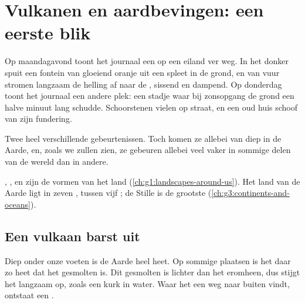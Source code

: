 \chapter{Vulkanen en aardbevingen: een eerste blik}\label{ch:g4:volcanoes-earthquakes-first-look}

Op maandagavond toont het journaal een  op een eiland ver weg. In
het donker spuit een fontein van gloeiend oranje  uit een spleet
in de grond, en  van vuur stromen langzaam de helling af naar de
, sissend en dampend. Op donderdag toont het journaal een andere plek:
een stadje waar bij zonsopgang de grond een halve minuut lang schudde.
Schoorstenen vielen op straat, en een oud huis schoof van zijn fundering.

Twee heel verschillende gebeurtenissen. Toch komen ze allebei van diep in
de Aarde, en, zoals we zullen zien, ze gebeuren allebei veel vaker in
sommige delen van de wereld dan in andere.

\begin{recall}
, ,  en  zijn de vormen van het land
(\cref{ch:g1:landscapes-around-us}). Het land van de Aarde ligt in zeven
, tussen vijf ; de Stille  is de grootste 
(\cref{ch:g3:continents-and-oceans}).
\end{recall}

\section{Een vulkaan barst uit}

Diep onder onze voeten is de Aarde heel heet. Op sommige plaatsen is het
 daar zo heet dat het gesmolten is. Dit gesmolten  is
lichter dan het  eromheen, dus stijgt het langzaam op, zoals
een kurk in water. Waar het een weg naar buiten vindt, ontstaat een .

